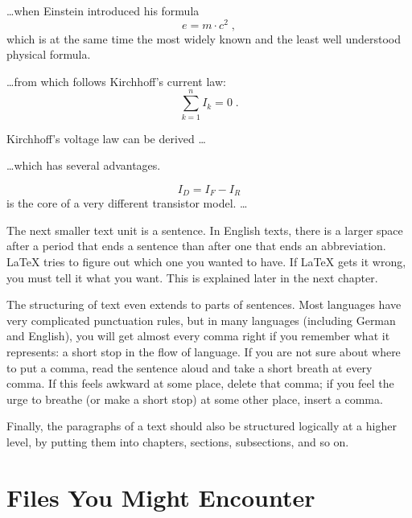 \begin{example}[standalone, paperwidth=5cm, paperheight=4cm]
\ldots when Einstein introduced
his formula
\begin{equation}
  e = m \cdot c^2 \; ,
\end{equation}
which is at the same time the
most widely known and the least
well understood physical formula.
\end{example}
\begin{example}[standalone, paperwidth=5cm, paperheight=4cm]
\ldots from which follows
Kirchhoff's current law:
\begin{equation}
  \sum_{k=1}^{n} I_k = 0 \; .
\end{equation}

Kirchhoff's voltage law can
be derived \ldots
\end{example}
\begin{example}[standalone, paperwidth=5cm, paperheight=4cm]
\ldots which has several
advantages.

\begin{equation}
  I_D = I_F - I_R
\end{equation}
is the core of a very different
transistor model. \ldots
\end{example}

The next smaller text unit is a sentence.  In English texts, there is
a larger space after a period that ends a sentence than after one
that ends an abbreviation.  \LaTeX{} tries to figure out which one
you wanted to have.  If \LaTeX{} gets it wrong, you must tell it what
you want.  This is explained later in the next chapter.

The structuring of text even extends to parts of sentences.  Most
languages have very complicated punctuation rules, but in many
languages (including German and English), you will get almost every
comma right if you remember what it represents: a short stop in the
flow of language.  If you are not sure about where to put a comma,
read the sentence aloud and take a short breath at every comma.  If
this feels awkward at some place, delete that comma; if you feel the
urge to breathe (or make a short stop) at some other place, insert a
comma.

Finally, the paragraphs of a text should also be structured logically at a
higher level, by putting them into chapters, sections, subsections, and so on.

\section{Files You Might Encounter}

